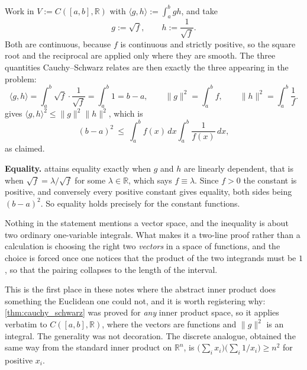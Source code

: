\begin{exercisesolution}
\label{sol:integral_reciprocal_inequality}
Work in $V := C([a,b],\mathbb{R})$ with $\langle g,h\rangle := \int_a^b g h$, and take
\[g := \sqrt{f}, \qquad h := \frac{1}{\sqrt f} .\]
Both are continuous, because $f$ is continuous and strictly positive, so the square root and the
reciprocal are applied only where they are smooth. The three quantities Cauchy--Schwarz relates
are then exactly the three appearing in the problem:
\[\langle g,h\rangle = \int_a^b \sqrt{f}\cdot\frac{1}{\sqrt f} = \int_a^b 1 = b-a, \qquad
  \|g\|^2 = \int_a^b f, \qquad \|h\|^2 = \int_a^b \frac1f .\]
 gives $\langle g,h\rangle^2 \leq \|g\|^2\|h\|^2$, which is
\[(b-a)^2 \ \leq\ \int_a^b f(x)\,dx \int_a^b \frac{1}{f(x)}\,dx ,\]
as claimed.

\textbf{Equality.}  attains equality exactly when $g$ and $h$ are
linearly dependent, that is when $\sqrt f = \lambda/\sqrt f$ for some $\lambda \in \mathbb{R}$,
which says $f \equiv \lambda$. Since $f > 0$ the constant is positive, and conversely every
positive constant gives equality, both sides being $(b-a)^2$. So equality holds precisely for the
constant functions.

\begin{remark}
Nothing in the statement mentions a vector space, and the inequality is about two ordinary
one-variable integrals. What makes it a two-line proof rather than a calculation is choosing the
right two \emph{vectors} in a space of functions, and the choice is forced once one notices that
the product of the two integrands must be $1$, so that the pairing collapses to the length of the
interval.

This is the first place in these notes where the abstract inner product does something the
Euclidean one could not, and it is worth registering why: \cref{thm:cauchy_schwarz} was proved
for \emph{any} inner product space, so it applies verbatim to $C([a,b],\mathbb{R})$, where the
vectors are functions and $\|g\|^2$ is an integral. The generality was not decoration. The
discrete analogue, obtained the same way from the standard inner product on $\mathbb{R}^n$, is
$\big(\sum_i x_i\big)\big(\sum_i 1/x_i\big) \geq n^2$ for positive $x_i$.
\end{remark}
\end{exercisesolution}

